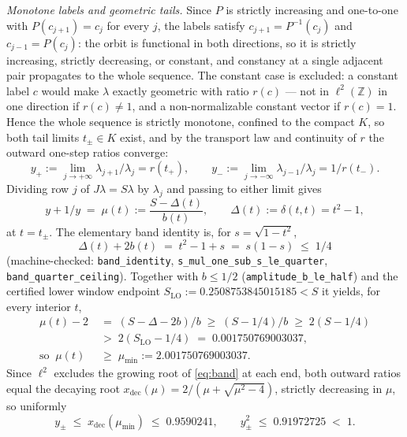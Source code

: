 \documentclass[11pt]{article}
\theoremstyle{remark}
\begin{document}
\emph{Monotone labels and geometric tails.} Since $P$ is strictly
increasing and one-to-one with $P(c_{j+1})=c_j$ for every $j$, the labels
satisfy $c_{j+1}=P^{-1}(c_j)$ and $c_{j-1}=P(c_j)$: the orbit is
functional in both directions, so it is strictly increasing, strictly
decreasing, or constant, and constancy at a single adjacent pair
propagates to the whole sequence. The constant case is excluded: a
constant label $c$ would make $\lambda$ exactly geometric with ratio
$r(c)$ --- not in $\ell^2(\mathbb{Z})$ in one direction if $r(c)\neq1$,
and a non-normalizable constant vector if $r(c)=1$. Hence the whole
sequence is strictly monotone, confined to the compact $K$, so both tail
limits $t_\pm\in K$ exist, and by the transport law and continuity of $r$
the outward one-step ratios converge:
\[
y_+ := \lim_{j\to+\infty}\lambda_{j+1}/\lambda_j = r(t_+),\qquad
y_- := \lim_{j\to-\infty}\lambda_{j-1}/\lambda_j = 1/r(t_-).
\]
Dividing row $j$ of $J\lambda=S\lambda$ by $\lambda_j$ and passing to
either limit gives
\begin{equation}\label{eq:band}
y+1/y \;=\; \mu(t) := \frac{S-\Delta(t)}{b(t)},\qquad
\Delta(t):=\delta(t,t)=t^2-1,
\end{equation}
at $t=t_\pm$. The elementary band identity is, for $s=\sqrt{1-t^2}$,
\begin{equation}\label{eq:bandid}
\Delta(t)+2b(t) \;=\; t^2-1+s \;=\; s(1-s) \;\le\; 1/4
\end{equation}
(machine-checked: \texttt{band\_identity},
\texttt{s\_mul\_one\_sub\_s\_le\_quarter},
\texttt{band\_quarter\_ceiling}). Together with $b\le1/2$
(\texttt{amplitude\_b\_le\_half}) and the certified lower window endpoint
$S_{\mathrm{LO}}:=0.2508753845015185<S$ it yields, for every interior $t$,
\begin{equation}\label{eq:mumin}
\begin{aligned}
\mu(t)-2 \;&=\; (S-\Delta-2b)/b \;\ge\; (S-1/4)/b \;\ge\; 2(S-1/4)\\
&>\; 2(S_{\mathrm{LO}}-1/4) \;=\; 0.001750769003037,\\
\text{so }\ \mu(t) \;&\ge\; \mu_{\min} := 2.001750769003037.
\end{aligned}
\end{equation}
Since $\ell^2$ excludes the growing root of \eqref{eq:band} at each end,
both outward ratios equal the decaying root
$x_{\mathrm{dec}}(\mu)=2/(\mu+\sqrt{\mu^2-4})$, strictly decreasing in
$\mu$, so uniformly
\begin{equation}\label{eq:ydec}
y_\pm \;\le\; x_{\mathrm{dec}}(\mu_{\min}) \;\le\; 0.9590241,\qquad
y_\pm^2 \;\le\; 0.91972725 \;<\; 1.
\end{equation}
\end{document}
